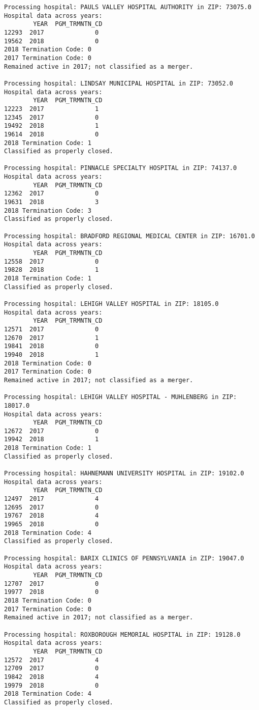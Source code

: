 \documentclass[
  letterpaper,
  DIV=11,
  numbers=noendperiod]{scrartcl}
\begin{document}
\begin{verbatim}
Processing hospital: PAULS VALLEY HOSPITAL AUTHORITY in ZIP: 73075.0
Hospital data across years:
        YEAR  PGM_TRMNTN_CD
12293  2017              0
19562  2018              0
2018 Termination Code: 0
2017 Termination Code: 0
Remained active in 2017; not classified as a merger.

Processing hospital: LINDSAY MUNICIPAL HOSPITAL in ZIP: 73052.0
Hospital data across years:
        YEAR  PGM_TRMNTN_CD
12223  2017              1
12345  2017              0
19492  2018              1
19614  2018              0
2018 Termination Code: 1
Classified as properly closed.

Processing hospital: PINNACLE SPECIALTY HOSPITAL in ZIP: 74137.0
Hospital data across years:
        YEAR  PGM_TRMNTN_CD
12362  2017              0
19631  2018              3
2018 Termination Code: 3
Classified as properly closed.

Processing hospital: BRADFORD REGIONAL MEDICAL CENTER in ZIP: 16701.0
Hospital data across years:
        YEAR  PGM_TRMNTN_CD
12558  2017              0
19828  2018              1
2018 Termination Code: 1
Classified as properly closed.

Processing hospital: LEHIGH VALLEY HOSPITAL in ZIP: 18105.0
Hospital data across years:
        YEAR  PGM_TRMNTN_CD
12571  2017              0
12670  2017              1
19841  2018              0
19940  2018              1
2018 Termination Code: 0
2017 Termination Code: 0
Remained active in 2017; not classified as a merger.

Processing hospital: LEHIGH VALLEY HOSPITAL - MUHLENBERG in ZIP: 18017.0
Hospital data across years:
        YEAR  PGM_TRMNTN_CD
12672  2017              0
19942  2018              1
2018 Termination Code: 1
Classified as properly closed.

Processing hospital: HAHNEMANN UNIVERSITY HOSPITAL in ZIP: 19102.0
Hospital data across years:
        YEAR  PGM_TRMNTN_CD
12497  2017              4
12695  2017              0
19767  2018              4
19965  2018              0
2018 Termination Code: 4
Classified as properly closed.

Processing hospital: BARIX CLINICS OF PENNSYLVANIA in ZIP: 19047.0
Hospital data across years:
        YEAR  PGM_TRMNTN_CD
12707  2017              0
19977  2018              0
2018 Termination Code: 0
2017 Termination Code: 0
Remained active in 2017; not classified as a merger.

Processing hospital: ROXBOROUGH MEMORIAL HOSPITAL in ZIP: 19128.0
Hospital data across years:
        YEAR  PGM_TRMNTN_CD
12572  2017              4
12709  2017              0
19842  2018              4
19979  2018              0
2018 Termination Code: 4
Classified as properly closed.


\end{verbatim}
\end{document}
